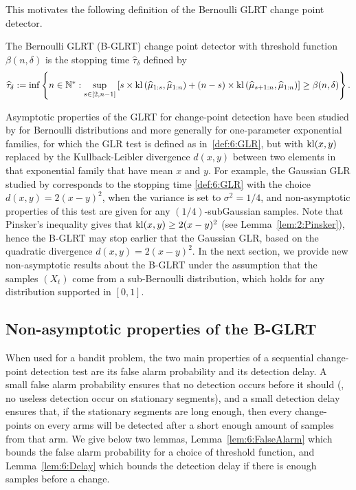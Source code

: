 This motivates the following definition of the Bernoulli GLRT change point detector.

\begin{definition}\label{def:6:GLRDef}
    The Bernoulli GLRT (B-GLRT) change point detector with threshold function $\beta(n,\delta)$ is the stopping time $\widehat{\tau}_{\delta}$ defined by
    \begin{equation}\label{def:6:GLR}
        \widehat{\tau}_{\delta} := \inf \left\{ n \in \mathbb{N}^* : \sup_{s \in [2,n-1]} \left[s \times \mathrm{kl}\left(\widehat{\mu}_{1:s},\widehat{\mu}_{1:n}\right) + (n-s) \times \mathrm{kl}\left(\widehat{\mu}_{s+1:n},\widehat{\mu}_{1:n}\right)\right] \geq \beta(n,\delta)\right\}.
    \end{equation}
\end{definition}

Asymptotic properties of the GLRT for change-point detection have been studied by \cite{LaiXing10} for Bernoulli distributions and more generally for one-parameter exponential families, for which the GLR test is defined as in~\eqref{def:6:GLR}, but with $\mathrm{kl}(x,y)$ replaced by the Kullback-Leibler divergence $d(x,y)$ between two elements in that exponential family that have mean $x$ and $y$.
For example, the Gaussian GLR studied by \cite{Maillard2018GLR} corresponds to the stopping time \eqref{def:6:GLR} with the choice $d(x,y) = 2(x-y)^2$, when the variance is set to $\sigma^2=1/4$, and non-asymptotic properties of this test are given for any $(1/4)$-subGaussian samples.
Note that Pinsker's inequality gives that $\mathrm{kl}(x,y) \geq 2(x-y)^2$ (see Lemma~\ref{lem:2:Pinsker}), hence the B-GLRT may stop earlier that the Gaussian GLR, based on the quadratic divergence $d(x,y) = 2(x-y)^2$.
%
In the next section, we provide new non-asymptotic results about the B-GLRT under the assumption that the samples $(X_t)$ come from a sub-Bernoulli distribution, which holds for any distribution supported in $[0,1]$.


\subsection{Non-asymptotic properties of the B-GLRT}\label{subsec:6:PropGLR}

When used for a bandit problem, the two main properties of a sequential change-point detection test are its false alarm probability and its detection delay.
%
A small false alarm probability ensures that no detection occurs before it should (\ie, no useless detection occur on stationary segments), and a small detection delay ensures that, if the stationary segments are long enough, then every change-points on every arms will be detected after a short enough amount of samples from that arm.
%
We give below two lemmas, Lemma~\ref{lem:6:FalseAlarm} which bounds the false alarm probability for a choice of threshold function, and Lemma~\ref{lem:6:Delay} which bounds the detection delay if there is enough samples before a change.


